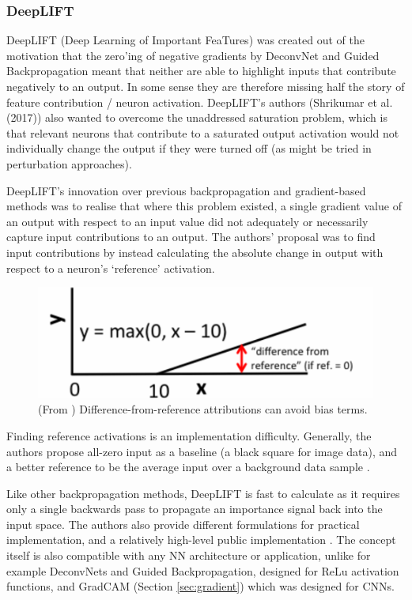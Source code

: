 \documentclass[main]{subfiles}
\begin{document}
\subsubsection{DeepLIFT}

DeepLIFT (Deep Learning of Important FeaTures) \cite{deeplift} was created out of the motivation that the zero'ing of negative gradients by DeconvNet and Guided Backpropagation meant that neither are able to highlight inputs that contribute negatively to an output. In some sense they are therefore missing half the story of feature contribution / neuron activation. DeepLIFT's authors (Shrikumar et al. (2017)) also wanted to overcome the unaddressed saturation problem, which is that relevant neurons that contribute to a saturated output activation would not individually change the output if they were turned off (as might be tried in perturbation approaches).

DeepLIFT's innovation over previous backpropagation and gradient-based methods was to realise that where this problem existed, a single gradient value of an output with respect to an input value did not adequately or necessarily capture input contributions to an output. The authors' proposal was to find input contributions by instead calculating the absolute change in output with respect to a neuron's `reference' activation. 

\begin{figure}[h]
\centering
\includegraphics[scale=0.3]{deeplift.png}
\caption{(From \cite{deeplift}) Difference-from-reference attributions can avoid bias terms.}
\label{deepliftimg}
\end{figure}

Finding reference activations is an implementation difficulty. Generally, the authors propose all-zero input as a baseline (a black square for image data), and a better reference to be the average input over a background data sample \cite{deeplift}.

Like other backpropagation methods, DeepLIFT is fast to calculate as it requires only a single backwards pass to propagate an importance signal back into the input space. The authors also provide different formulations for practical implementation, and a relatively high-level public implementation \cite{deepliftrepo}. The concept itself is also compatible with any NN architecture or application, unlike for example DeconvNets and Guided Backpropagation, designed for ReLu activation functions, and GradCAM (Section \ref{sec:gradient}) which was designed for CNNs.
\end{document}
